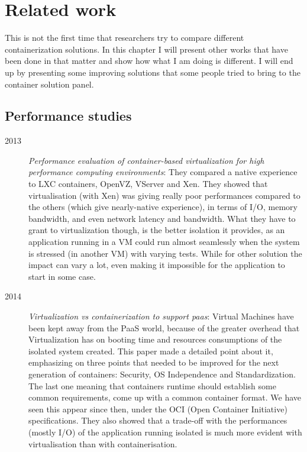 \chapter{Related work}

This is not the first time that researchers try to compare different containerization solutions.  In this chapter I will present other works that have been done in that matter and show how what I am doing is different.  I will end up by presenting some improving solutions that some people tried to bring to the container solution panel.

\section{Performance studies}

\begin{description}
  \item[2013]\textit{Performance evaluation of container-based virtualization for high performance computing environments}\cite{xavier2013performance}: They compared a native experience to LXC containers, OpenVZ, VServer and Xen.  They showed that virtualisation (with Xen) was giving really poor performances compared to the others (which give nearly-native experience), in terms of I/O, memory bandwidth, and even network latency and bandwidth.  What they have to grant to virtualization though, is the better isolation it provides, as an application running in a VM could run almost seamlessly when the system is stressed (in another VM) with varying tests.  While for other solution the impact can vary a lot, even making it impossible for the application to start in some case.
  
  \item[2014] \textit{Virtualization vs containerization to support paas}\cite{dua2014virtualization}: Virtual Machines have been kept away from the PaaS world, because of the greater overhead that Virtualization has on booting time and resources consumptions of the isolated system created.  This paper made a detailed point about it, emphasizing on three points that needed to be improved for the next generation of containers: Security, OS Independence and Standardization.  The last one meaning that containers runtime should establish some common requirements, come up with a common container format.  We have seen this appear since then, under the OCI (Open Container Initiative) specifications.  They also showed that a trade-off with the performances (mostly I/O) of the application running isolated is much more evident with virtualisation than with containerisation.
  

\end{description}
